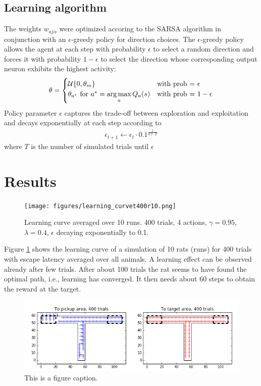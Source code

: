 \subsection{Learning algorithm}
The weights $w_{aj\alpha}$ were optimized accoring to the SARSA algorithm in conjunction with an $\epsilon$-greedy policy for direction choices. The $\epsilon$-greedy policy allows the agent at each step with probability $\epsilon$ to select a random direction and forces it with probability $1-\epsilon$ to select the direction whose corresponding output neuron exhibits the highest activity:
\begin{align}
\theta = \begin{cases}
\mathcal{U}\{0, \theta_m\} &\text{with prob = $\epsilon$}\\
\theta_{a^*}\text{ for } a^* = \operatorname*{arg\,max}\limits_a Q_a(s) &\text{with prob = $1 - \epsilon$}
\end{cases}
\end{align}
Policy parameter $\epsilon$ captures the trade-off between exploration and exploitation and decays exponentially at each step according to 
\begin{align}
\epsilon_{t+1} \leftarrow \epsilon_t \cdot 0.1^{\frac{1}{0.7 \cdot T}}
\end{align}
where $T$ is the number of simulated trials until $\epsilon$



\section{Results}
\label{sec:results}
\begin{figure}[h]
\centering
\texttt{[image: figures/learning\_curvet400r10.png]}
\caption{\label{fig:sim1}Learning curve averaged over 10 runs. 400 trials, 4 actions, $\gamma=0.95$, $\lambda=0.4$, $\epsilon$ decaying exponentially to 0.1.}
\end{figure}
Figure \ref{fig:sim1} shows the learning curve of a simulation of 10 rats (runs) for 400 trials with escape latency averaged over all animals. A learning effect can be observed already after few trials. After about 100 trials the rat seems to have found the optimal path, i.e., learning has converged. It then needs about 60 steps to obtain the reward at the target. 
\begin{figure}[h]
\centering
\includegraphics[width=1\textwidth]{figures/navigation_map.png}
\caption{\label{fig:nav}This is a figure caption.}
\end{figure}

